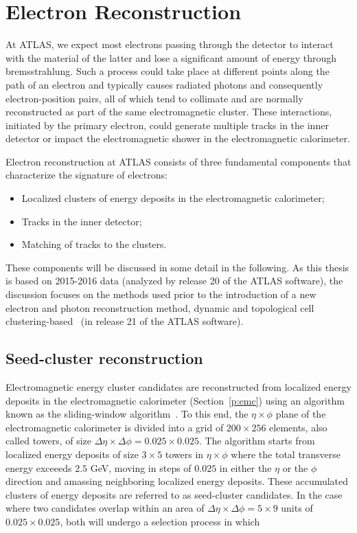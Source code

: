 \section{Electron Reconstruction}\label{s:ereco}

At ATLAS, we expect most electrons passing through the detector to interact
with the material of the latter and lose a significant amount of energy through
bremsstrahlung. Such a process could take place at different points along the
path of an electron and typically causes radiated photons and consequently
electron-position pairs, all of which tend to collimate and are normally
reconstructed as part of the same electromagnetic cluster. These interactions,
initiated by the primary electron, could generate multiple tracks in the inner
detector or impact the electromagnetic shower in the electromagnetic
calorimeter.

Electron reconstruction at ATLAS consists of three fundamental components that
characterize the signature of electrons:

\begin{itemize}
	\item Localized clusters of energy deposits in the electromagnetic calorimeter;
	\item Tracks in the inner detector;
	\item Matching of tracks to the clusters.
\end{itemize}

These components will be discussed in some detail in the following. As this
thesis is based on 2015-2016 data (analyzed by release 20 of the ATLAS
software), the discussion focuses on the methods used prior to the introduction
of a new electron and photon reconstruction method, dynamic and topological
cell clustering-based~\cite{atlaselscluster} (in release 21 of the ATLAS
software).


\subsection{Seed-cluster reconstruction}

Electromagnetic energy cluster candidates are reconstructed from localized
energy deposits in the electromagnetic calorimeter (Section~\ref{p:emc}) using
an algorithm known as the sliding-window algorithm~\cite{calclusalg}. To this
end, the $\eta\times \phi$ plane of the electromagnetic calorimeter is divided
into a grid of $200\times 256$ elements, also called towers, of size $\Delta
	\eta \times \Delta \phi = 0.025 \times 0.025$. The algorithm starts from
localized energy deposits of size $3 \times 5$ towers in $\eta \times \phi$
where the total transverse energy exceeeds $2.5$ GeV, moving in steps of
$0.025$ in either the $\eta$ or the $\phi$ direction and amassing neighboring
localized energy deposits. These accumulated clusters of energy deposits are
referred to as seed-cluster candidates. In the case where two candidates
overlap within an area of $\Delta \eta\times \Delta \phi = 5 \times 9$ units of
$0.025 \times 0.025$, both will undergo a selection process in which

